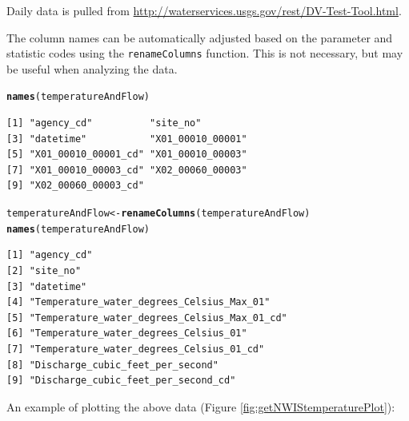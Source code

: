 \documentclass[a4paper,11pt]{article}\usepackage[]{graphicx}\usepackage[]{color}
\makeatletter
\newcommand{\hlstd}[1]{\textcolor[rgb]{0.345,0.345,0.345}{#1}}%
\newcommand{\hlkwb}[1]{\textcolor[rgb]{0.69,0.353,0.396}{#1}}%
\newcommand{\hlkwd}[1]{\textcolor[rgb]{0.737,0.353,0.396}{\textbf{#1}}}%
\newenvironment{kframe}{%
 \def\at@end@of@kframe{}%
 \ifinner\ifhmode%
  \def\at@end@of@kframe{\end{minipage}}%
  \begin{minipage}{\columnwidth}%
 \fi\fi%
 \def\FrameCommand##1{\hskip\@totalleftmargin \hskip-\fboxsep
 \colorbox{shadecolor}{##1}\hskip-\fboxsep
     \hskip-\linewidth \hskip-\@totalleftmargin \hskip\columnwidth}%
 \MakeFramed {\advance\hsize-\width
   \@totalleftmargin\z@ \linewidth\hsize
   \@setminipage}}%
 {\par\unskip\endMakeFramed%
 \at@end@of@kframe}
\newenvironment{knitrout}{}{} %
\makeatother
\begin{document}
Daily data is pulled from \url{http://waterservices.usgs.gov/rest/DV-Test-Tool.html}.

The column names can be automatically adjusted based on the parameter and statistic codes using the \texttt{renameColumns} function. This is not necessary, but may be useful when analyzing the data. 

\begin{knitrout}
\color{fgcolor}\begin{kframe}
\begin{alltt}
\hlkwd{names}\hlstd{(temperatureAndFlow)}
\end{alltt}
\begin{verbatim}
[1] "agency_cd"          "site_no"           
[3] "datetime"           "X01_00010_00001"   
[5] "X01_00010_00001_cd" "X01_00010_00003"   
[7] "X01_00010_00003_cd" "X02_00060_00003"   
[9] "X02_00060_00003_cd"
\end{verbatim}
\begin{alltt}
\hlstd{temperatureAndFlow} \hlkwb{<-} \hlkwd{renameColumns}\hlstd{(temperatureAndFlow)}
\hlkwd{names}\hlstd{(temperatureAndFlow)}
\end{alltt}
\begin{verbatim}
[1] "agency_cd"                                  
[2] "site_no"                                    
[3] "datetime"                                   
[4] "Temperature_water_degrees_Celsius_Max_01"   
[5] "Temperature_water_degrees_Celsius_Max_01_cd"
[6] "Temperature_water_degrees_Celsius_01"       
[7] "Temperature_water_degrees_Celsius_01_cd"    
[8] "Discharge_cubic_feet_per_second"            
[9] "Discharge_cubic_feet_per_second_cd"         
\end{verbatim}
\end{kframe}
\end{knitrout}

An example of plotting the above data (Figure \ref{fig:getNWIStemperaturePlot}):
\end{document}
